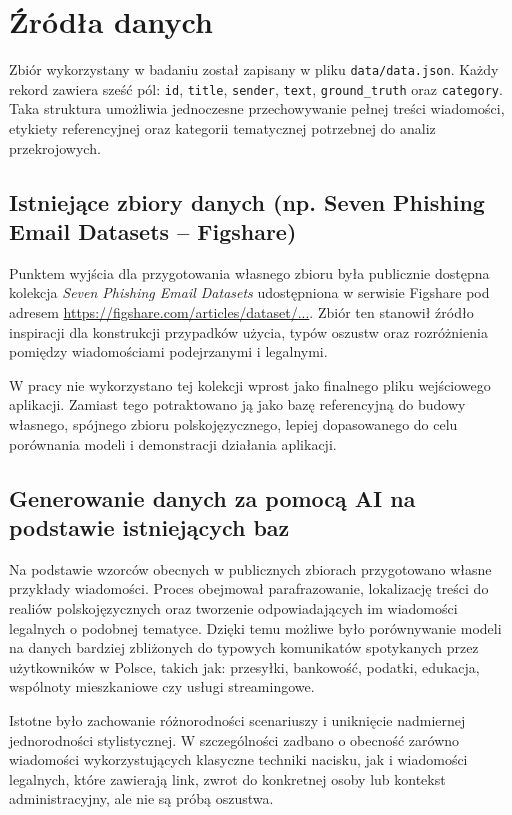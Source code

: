 \documentclass[12pt,a4paper,openright]{report}
\begin{document}
\section{Źródła danych}

Zbiór wykorzystany w badaniu został zapisany w pliku \texttt{data/data.json}. Każdy rekord zawiera sześć pól: \texttt{id}, \texttt{title}, \texttt{sender}, \texttt{text}, \texttt{ground\_truth} oraz \texttt{category}. Taka struktura umożliwia jednoczesne przechowywanie pełnej treści wiadomości, etykiety referencyjnej oraz kategorii tematycznej potrzebnej do analiz przekrojowych.

\subsection{Istniejące zbiory danych (np. Seven Phishing Email Datasets -- Figshare)}

Punktem wyjścia dla przygotowania własnego zbioru była publicznie dostępna kolekcja \textit{Seven Phishing Email Datasets} udostępniona w serwisie Figshare pod adresem \href{https://figshare.com/articles/dataset/Seven_Phishing_Email_Datasets/25432108}{https://figshare.com/articles/dataset/...}. Zbiór ten stanowił źródło inspiracji dla konstrukcji przypadków użycia, typów oszustw oraz rozróżnienia pomiędzy wiadomościami podejrzanymi i legalnymi.

W pracy nie wykorzystano tej kolekcji wprost jako finalnego pliku wejściowego aplikacji. Zamiast tego potraktowano ją jako bazę referencyjną do budowy własnego, spójnego zbioru polskojęzycznego, lepiej dopasowanego do celu porównania modeli i demonstracji działania aplikacji.

\subsection{Generowanie danych za pomocą AI na podstawie istniejących baz}

Na podstawie wzorców obecnych w publicznych zbiorach przygotowano własne przykłady wiadomości. Proces obejmował parafrazowanie, lokalizację treści do realiów polskojęzycznych oraz tworzenie odpowiadających im wiadomości legalnych o podobnej tematyce. Dzięki temu możliwe było porównywanie modeli na danych bardziej zbliżonych do typowych komunikatów spotykanych przez użytkowników w Polsce, takich jak: przesyłki, bankowość, podatki, edukacja, wspólnoty mieszkaniowe czy usługi streamingowe.

Istotne było zachowanie różnorodności scenariuszy i uniknięcie nadmiernej jednorodności stylistycznej. W szczególności zadbano o obecność zarówno wiadomości wykorzystujących klasyczne techniki nacisku, jak i wiadomości legalnych, które zawierają link, zwrot do konkretnej osoby lub kontekst administracyjny, ale nie są próbą oszustwa.
\end{document}
